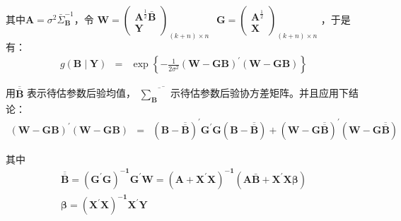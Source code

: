 		其中$ \boldsymbol{A} = \sigma^{2} \bar{\Sigma}_{\boldsymbol{B}}^{-1} $，令 $ \boldsymbol{W} = \left(
			\begin{array}{c}
				\boldsymbol{A}^{\frac{1}{2}} \bar{\boldsymbol{B}} \\
				\boldsymbol{Y}
		    \end{array}\right)_{(k+n) \times n \quad} \boldsymbol{G} = \left(\begin{array}{c}
				\boldsymbol{A}^{\frac{1}{2}} \\
				\boldsymbol{X}
		\end{array}\right)_{(k+n) \times n} $ ，于是有：
		\begin{eqnarray}
			g(\boldsymbol{B \mid Y}) & = & \exp \left\{- \frac{1}{2 \sigma^{2}}\boldsymbol{(W-G B)^{\prime}(W-G B)}\right\}
		\label{eq 3.5.6}
		\end{eqnarray}
		
		用$ \boldsymbol{\overline{\overline{{B}}}} $ 表示待估参数后验均值，
		$ \boldsymbol{\overline{\overline{\sum_{B}}}} $
		示待估参数后验协方差矩阵。并且应用下结论：
		\begin{eqnarray}
			\boldsymbol{(W-G B)^{\prime}(W-G B)} & = & 
			\boldsymbol{(B-\overline{\overline{B}})^{\prime} G^{\prime} G(B-\overline{\overline{B}})+(W-G \overline{\overline{B}})^{\prime}(W-G \overline{\overline{B}})}
		\label{eq 3.5.7}
		\end{eqnarray}
		
		其中
		 $$ \begin{array}{l}
			\boldsymbol{\overline{\overline{B}} = \left(G^{\prime} G\right)^{-1} G^{\prime} W=\left(A+X^{\prime} X\right)^{-1}\left(A \bar{B}+X^{\prime} X \beta\right)} \\
			\boldsymbol{\beta=\left(X^{\prime} X\right)^{-1} X^{\prime} Y}
		\end{array} $$
		
